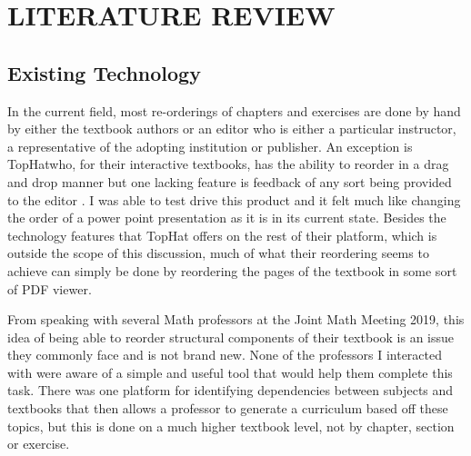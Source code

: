 %
%
%
%


\pagestyle{plain} %

\chapter{LITERATURE REVIEW}

\section{Existing Technology}

In the current field, most re-orderings of chapters and exercises are done by hand by either the textbook authors or an editor who is either a particular instructor, a representative of the adopting institution or publisher. An exception is TopHat\texttrademark\;who, for their interactive textbooks, has the ability to reorder in a drag and drop manner but one lacking feature is feedback of any sort being provided to the editor \cite{tophat}. I was able to test drive this product and it felt much like changing the order of a power point presentation as it is in its current state. Besides the technology features that TopHat offers on the rest of their platform, which is outside the scope of this discussion, much of what their reordering seems to achieve can simply be done by reordering the pages of the textbook in some sort of PDF viewer.

From speaking with several Math professors at the Joint Math Meeting 2019, this idea of being able to reorder structural components of their textbook is an issue they commonly face and is not brand new. None of the professors I interacted with were aware of a simple and useful tool that would help them complete this task. There was one platform for identifying dependencies between subjects and textbooks that then allows a professor to generate a curriculum based off these topics, but this is done on a much higher textbook level, not by chapter, section or exercise.

